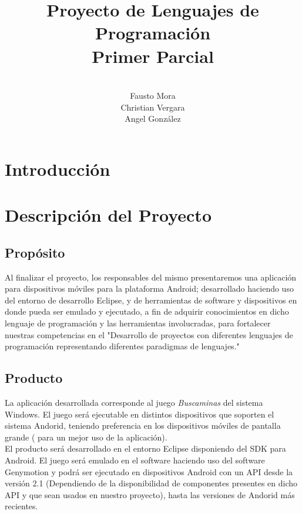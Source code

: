 \documentclass[11pt]{article} %
\title{Proyecto de Lenguajes de Programaci\'on \\ Primer Parcial}
\author{\\Fausto Mora \\Christian Vergara \\ Angel Gonz\'alez}
\begin{document}

\maketitle

\newpage
\thispagestyle{empty}
\tableofcontents

\newpage
\thispagestyle{empty}


\section{Introducción}

\section{Descripci\'on del Proyecto}
\subsection{Prop\'osito}
Al finalizar el proyecto, los responsables del mismo presentaremos una aplicaci\'on para dispositivos m\'oviles para la plataforma Android; desarrollado haciendo uso del entorno de desarrollo Eclipse, y de herramientas de software y dispositivos en donde pueda ser emulado y ejecutado, a fin de adquirir conocimientos en dicho lenguaje de programaci\'on y las herramientas involucradas, para fortalecer nuestras competencias en el "Desarrollo de proyectos con diferentes lenguajes de programaci\'on representando diferentes paradigmas de lenguajes."
\subsection{Producto}
La aplicaci\'on desarrollada corresponde al juego \textsl{Buscaminas} del sistema Windows. El juego será ejecutable en distintos dispositivos que soporten el sistema Andorid, teniendo preferencia en los dispositivos m\'oviles de pantalla grande ( para un mejor uso de la aplicaci\'on).
\\El producto ser\'a desarrollado en el entorno Eclipse disponiendo del SDK para Android. El juego ser\'a emulado en el software haciendo uso del software Genymotion y podr\'a ser ejecutado en dispositivos Android con un API desde la versi\'on 2.1 (Dependiendo de la disponibilidad de componentes presentes en dicho API y que sean usados en nuestro proyecto), hasta las versiones de Andorid m\'as recientes.
\end{document}
